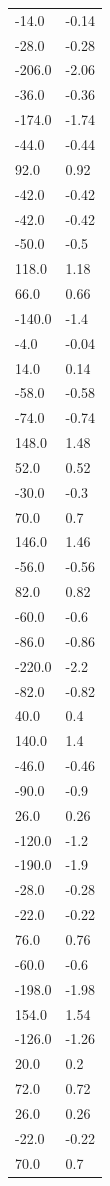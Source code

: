 \begin{longtable}{ll}
-14.0 & -0.14 \\
-28.0 & -0.28 \\
-206.0 & -2.06 \\
-36.0 & -0.36 \\
-174.0 & -1.74 \\
-44.0 & -0.44 \\
92.0 & 0.92 \\
-42.0 & -0.42 \\
-42.0 & -0.42 \\
-50.0 & -0.5 \\
118.0 & 1.18 \\
66.0 & 0.66 \\
-140.0 & -1.4 \\
-4.0 & -0.04 \\
14.0 & 0.14 \\
-58.0 & -0.58 \\
-74.0 & -0.74 \\
148.0 & 1.48 \\
52.0 & 0.52 \\
-30.0 & -0.3 \\
70.0 & 0.7 \\
146.0 & 1.46 \\
-56.0 & -0.56 \\
82.0 & 0.82 \\
-60.0 & -0.6 \\
-86.0 & -0.86 \\
-220.0 & -2.2 \\
-82.0 & -0.82 \\
40.0 & 0.4 \\
140.0 & 1.4 \\
-46.0 & -0.46 \\
-90.0 & -0.9 \\
26.0 & 0.26 \\
-120.0 & -1.2 \\
-190.0 & -1.9 \\
-28.0 & -0.28 \\
-22.0 & -0.22 \\
76.0 & 0.76 \\
-60.0 & -0.6 \\
-198.0 & -1.98 \\
154.0 & 1.54 \\
-126.0 & -1.26 \\
20.0 & 0.2 \\
72.0 & 0.72 \\
26.0 & 0.26 \\
-22.0 & -0.22 \\
70.0 & 0.7 \\

\end{longtable}
